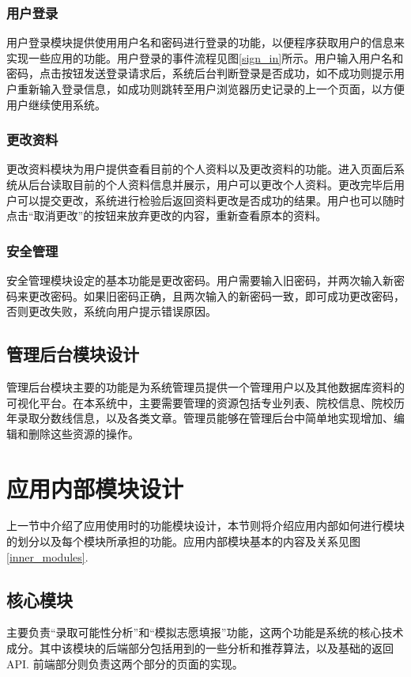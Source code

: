 \documentclass[a4paper,AutoFakeBold,oneside,12pt]{book}
\begin{document}
\subsubsection{用户登录}
用户登录模块提供使用用户名和密码进行登录的功能，以便程序获取用户的信息来实现一些应用的功能。用户登录的事件流程见图\ref{sign_in}所示。用户输入用户名和密码，点击按钮发送登录请求后，系统后台判断登录是否成功，如不成功则提示用户重新输入登录信息，如成功则跳转至用户浏览器历史记录的上一个页面，以方便用户继续使用系统。

\subsubsection{更改资料}
更改资料模块为用户提供查看目前的个人资料以及更改资料的功能。进入页面后系统从后台读取目前的个人资料信息并展示，用户可以更改个人资料。更改完毕后用户可以提交更改，系统进行检验后返回资料更改是否成功的结果。用户也可以随时点击“取消更改”的按钮来放弃更改的内容，重新查看原本的资料。

\subsubsection{安全管理}
安全管理模块设定的基本功能是更改密码。用户需要输入旧密码，并两次输入新密码来更改密码。如果旧密码正确，且两次输入的新密码一致，即可成功更改密码，否则更改失败，系统向用户提示错误原因。

\subsection{管理后台模块设计}
管理后台模块主要的功能是为系统管理员提供一个管理用户以及其他数据库资料的可视化平台。在本系统中，主要需要管理的资源包括专业列表、院校信息、院校历年录取分数线信息，以及各类文章。管理员能够在管理后台中简单地实现增加、编辑和删除这些资源的操作。

\section{应用内部模块设计}
上一节中介绍了应用使用时的功能模块设计，本节则将介绍应用内部如何进行模块的划分以及每个模块所承担的功能。应用内部模块基本的内容及关系见图\ref{inner_modules}.

\subsection{核心模块}
主要负责“录取可能性分析”和“模拟志愿填报”功能，这两个功能是系统的核心技术成分。其中该模块的后端部分包括用到的一些分析和推荐算法，以及基础的返回 API. 前端部分则负责这两个部分的页面的实现。
\end{document}
